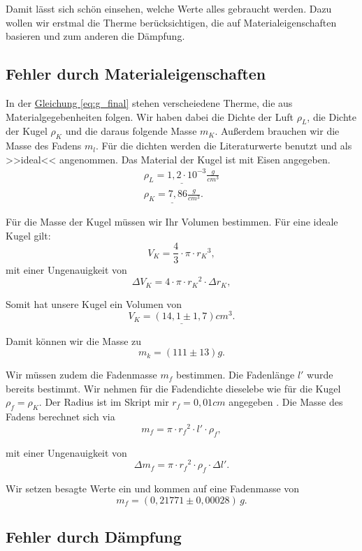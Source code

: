 Damit lässt sich schön einsehen, welche Werte alles gebraucht werden. Dazu wollen wir erstmal die Therme berücksichtigen, die auf Materialeigenschaften basieren und zum anderen die Dämpfung. 

\subsection{Fehler durch Materialeigenschaften}
In der \hyperref[eq:g_final]{Gleichung \ref*{eq:g_final}} stehen verscheiedene Therme, die aus Materialgegebenheiten folgen. Wir haben dabei die Dichte der Luft $\rho_L$, die Dichte der Kugel $\rho_K$ und die daraus folgende Masse $m_K$. Außerdem brauchen wir die Masse des Fadens $m_l$. Für die dichten werden die Literaturwerte benutzt und als >>ideal<< angenommen. Das Material der Kugel ist mit Eisen angegeben.
\begin{align}
    \underline{\rho_L = 1,2 \cdot 10^{-3} \frac{g}{cm^3}} \\
    \underline{\rho_K = 7,86 \frac{g}{cm^3}}.
\end{align}

Für die Masse der Kugel müssen wir Ihr Volumen bestimmen. Für eine ideale Kugel gilt:
\begin{equation}
    V_K = \frac{4}{3} \cdot \pi \cdot {r_K}^3,
\end{equation}
mit einer Ungenauigkeit von
\begin{equation}
    \Delta V_K = 4 \cdot \pi \cdot {r_K}^2 \cdot \Delta r_K,
\end{equation}

Somit hat unsere Kugel ein Volumen von
\begin{equation}
    \underline{
        V_K = (14,1 \pm 1,7) cm^3.
    }
\end{equation}

Damit können wir die Masse zu 
\begin{equation}
    \boxed{
        m_k = (111 \pm 13) g.
    }
\end{equation}

Wir müssen zudem die Fadenmasse $m_f$ bestimmen. Die Fadenlänge $l'$ wurde bereits bestimmt. Wir nehmen für die Fadendichte dieselebe wie für die Kugel $\rho_f = \rho_K$. Der Radius ist im Skript mir $r_f = 0,01cm$ angegeben \cite{skript25}.
Die Masse des Fadens berechnet sich via
\begin{equation}
    m_f = \pi \cdot {r_f}^2 \cdot l' \cdot \rho_f,
\end{equation}

mit einer Ungenauigkeit von
\begin{equation}
    \Delta m_f = \pi \cdot {r_f}^2 \cdot \rho_f \cdot \Delta l'.
\end{equation}

Wir setzen besagte Werte ein und kommen auf eine Fadenmasse von
\begin{equation}
    m_f = (0,21771 \pm 0,00028) \, g.
\end{equation}

\subsection{Fehler durch Dämpfung}